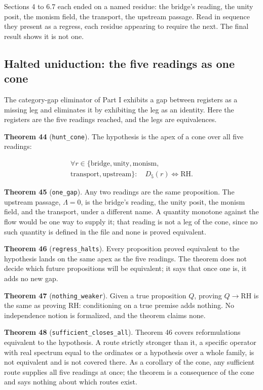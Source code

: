\documentclass[10pt,twocolumn]{article}
\begin{document}
Sections 4 to 6.7 each ended on a named residue: the bridge's reading,
the unity posit, the monism field, the transport, the upstream passage.
Read in sequence they present as a regress, each residue appearing to
require the next. The final result shows it is not one.

\hypertarget{halted-uniduction-the-five-readings-as-one-cone}{%
\subsection{Halted uniduction: the five readings as one
cone}\label{halted-uniduction-the-five-readings-as-one-cone}}

The category-gap eliminator of Part I exhibits a gap between registers
as a missing leg and eliminates it by exhibiting the leg as an identity.
Here the registers are the five readings reached, and the legs are
equivalences.

\textbf{Theorem 44} (\texttt{hunt\_cone}). The hypothesis is the apex of
a cone over all five readings:

\[\begin{gathered}\forall r \in \{\text{bridge}, \text{unity}, \text{monism},\\ \text{transport}, \text{upstream}\}:\quad D_5(r) \iff \mathrm{RH}.\end{gathered}\]

\textbf{Theorem 45} (\texttt{one\_gap}). Any two readings are the same
proposition. The upstream passage, \(\Lambda = 0\), is the bridge's
reading, the unity posit, the monism field, and the transport, under a
different name. A quantity monotone against the flow would be one way to
supply it; that reading is not a leg of the cone, since no such quantity
is defined in the file and none is proved equivalent.

\textbf{Theorem 46} (\texttt{regress\_halts}). Every proposition proved
equivalent to the hypothesis lands on the same apex as the five
readings. The theorem does not decide which future propositions will be
equivalent; it says that once one is, it adds no new gap.

\textbf{Theorem 47} (\texttt{nothing\_weaker}). Given a true proposition
\(Q\), proving \(Q \to \mathrm{RH}\) is the same as proving RH:
conditioning on a true premise adds nothing. No independence notion is
formalized, and the theorem claims none.

\textbf{Theorem 48} (\texttt{sufficient\_closes\_all}). Theorem 46
covers reformulations equivalent to the hypothesis. A route strictly
stronger than it, a specific operator with real spectrum equal to the
ordinates or a hypothesis over a whole family, is not equivalent and is
not covered there. As a corollary of the cone, any sufficient route
supplies all five readings at once; the theorem is a consequence of the
cone and says nothing about which routes exist.
\end{document}
